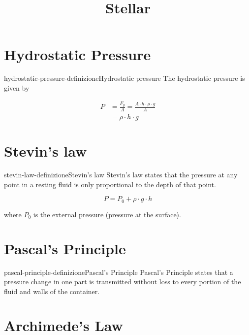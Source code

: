 \documentclass[preview]{standalone}
\begin{document}
\title{Stellar}
\genpage

\section{Hydrostatic Pressure}

\begin{snippetdefinition}{hydrostatic-pressure-definizione}{Hydrostatic pressure}
    The hydrostatic pressure is given by
    
    \begin{align*}
        P &= \frac{F_g}{A} = \frac{A \cdot h \cdot \rho \cdot g}{A} \\
        &= \rho \cdot h \cdot g
    \end{align*}
\end{snippetdefinition}


\section{Stevin's law}

\begin{snippetdefinition}{stevin-law-definizione}{Stevin's law}
    Stevin's law states that the pressure at any point
    in a resting fluid is only proportional to the depth of that point.

    \[
        P = P_0 + \rho \cdot g \cdot h
    \]

    where \(P_0\) is the external pressure (pressure at the surface).
\end{snippetdefinition}

\section{Pascal's Principle}

\begin{snippetdefinition}{pascal-principle-definizione}{Pascal's Principle}
    Pascal's Principle states that a pressure change in one part
is transmitted without loss to every portion of the fluid and walls of the container.
\end{snippetdefinition}

\section{Archimede's Law}
\end{document}
